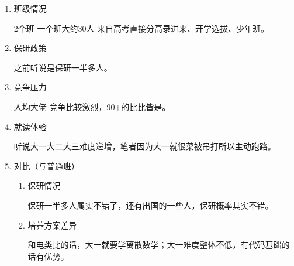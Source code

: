 \documentclass[zihao=-4,fontset=none]{Beautybook-CN}
\begin{document}
\begin{enumerate}
			
	\item 班级情况
	      
	      2个班 一个班大约30人 来自高考直接分高录进来、开学选拔、少年班。
	      
	\item 保研政策
	      
	      之前听说是保研一半多人。
	      
	\item 竞争压力
	      
	      人均大佬 竞争比较激烈，90+的比比皆是。
	      
	\item 就读体验
	      
	      听说大一大二大三难度递增，笔者因为大一就很菜被吊打所以主动跑路。
	      	      	      
	\item 对比（与普通班）
	      	      	      
	      \begin{enumerate}
	      	\item 保研情况
	      	      	      	      	      	      
	      	      保研一半多人属实不错了，还有出国的一些人，保研概率其实不错。
	      	      	      	      	      	      
	      	\item 培养方案差异
	      	      	      	      	      	      
	      	      和电类比的话，大一就要学离散数学；大一难度整体不低，有代码基础的话有优势。
	      \end{enumerate}
\end{enumerate}
\end{document}
